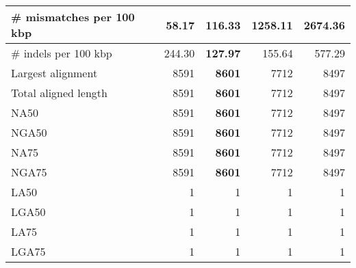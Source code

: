 \documentclass[12pt,a4paper]{article}
\begin{document}
\begin{table}[ht]
\begin{center}
\begin{tabular}{|l*{4}{|r}|}
\# mismatches per 100 kbp & {\bf 58.17} & 116.33 & 1258.11 & 2674.36 \\ \hline
\# indels per 100 kbp & 244.30 & {\bf 127.97} & 155.64 & 577.29 \\ \hline
Largest alignment & 8591 & {\bf 8601} & 7712 & 8497 \\ \hline
Total aligned length & 8591 & {\bf 8601} & 7712 & 8497 \\ \hline
NA50 & 8591 & {\bf 8601} & 7712 & 8497 \\ \hline
NGA50 & 8591 & {\bf 8601} & 7712 & 8497 \\ \hline
NA75 & 8591 & {\bf 8601} & 7712 & 8497 \\ \hline
NGA75 & 8591 & {\bf 8601} & 7712 & 8497 \\ \hline
LA50 & 1 & 1 & 1 & 1 \\ \hline
LGA50 & 1 & 1 & 1 & 1 \\ \hline
LA75 & 1 & 1 & 1 & 1 \\ \hline
LGA75 & 1 & 1 & 1 & 1 \\ \hline
\end{tabular}
\end{center}
\end{table}
\end{document}
